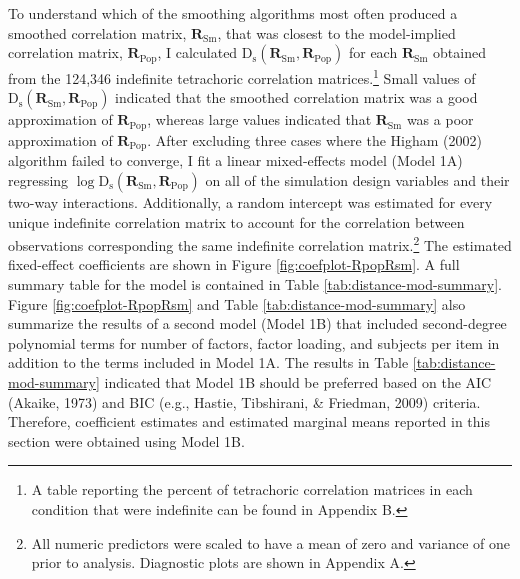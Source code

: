 \documentclass[
  english,
  man]{apa6}
\begin{document}
To understand which of the smoothing algorithms most often produced a smoothed correlation matrix, \(\mathbf{R}_{\textrm{Sm}}\), that was closest to the model-implied correlation matrix, \(\mathbf{R}_{\textrm{Pop}}\), I calculated \(\mathrm{D}_{\mathrm{s}}(\mathbf{R}_{\textrm{Sm}}, \mathbf{R}_{\textrm{Pop}})\) for each \(\mathbf{R}_{\textrm{Sm}}\) obtained from the 124,346 indefinite tetrachoric correlation matrices.\footnote{A table reporting the percent of tetrachoric correlation matrices in each condition that were indefinite can be found in Appendix B.} Small values of \(\mathrm{D}_{\mathrm{s}}(\mathbf{R}_{\textrm{Sm}}, \mathbf{R}_{\textrm{Pop}})\) indicated that the smoothed correlation matrix was a good approximation of \(\mathbf{R}_{\textrm{Pop}}\), whereas large values indicated that \(\mathbf{R}_{\textrm{Sm}}\) was a poor approximation of \(\mathbf{R}_{\textrm{Pop}}\). After excluding three cases where the Higham (2002) algorithm failed to converge, I fit a linear mixed-effects model (Model 1A) regressing \(\log \mathrm{D}_{\mathrm{s}}(\mathbf{R}_{\textrm{Sm}}, \mathbf{R}_{\textrm{Pop}})\) on all of the simulation design variables and their two-way interactions. Additionally, a random intercept was estimated for every unique indefinite correlation matrix to account for the correlation between observations corresponding the same indefinite correlation matrix.\footnote{All numeric predictors were scaled to have a mean of zero and variance of one prior to analysis. Diagnostic plots are shown in Appendix A.} The estimated fixed-effect coefficients are shown in Figure \ref{fig:coefplot-RpopRsm}. A full summary table for the model is contained in Table \ref{tab:distance-mod-summary}. Figure \ref{fig:coefplot-RpopRsm} and Table \ref{tab:distance-mod-summary} also summarize the results of a second model (Model 1B) that included second-degree polynomial terms for number of factors, factor loading, and subjects per item in addition to the terms included in Model 1A. The results in Table \ref{tab:distance-mod-summary} indicated that Model 1B should be preferred based on the AIC (Akaike, 1973) and BIC (e.g., Hastie, Tibshirani, \& Friedman, 2009) criteria. Therefore, coefficient estimates and estimated marginal means reported in this section were obtained using Model 1B.
\end{document}

